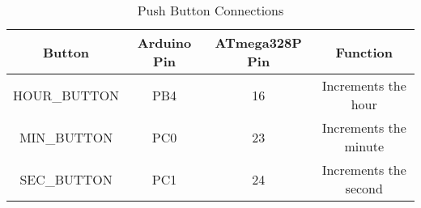 \begin{table}[h]
    \centering
    \begin{tabular}{|c|c|c|c|}
        \hline
        \textbf{Button} & \textbf{Arduino Pin} & \textbf{ATmega328P Pin} & \textbf{Function} \\
        \hline
        HOUR\_BUTTON   & PB4 & 16 & Increments the hour \\
        MIN\_BUTTON    & PC0 & 23 & Increments the minute \\
        SEC\_BUTTON    & PC1 & 24 & Increments the second \\
        \hline
    \end{tabular}
    \caption{Push Button Connections}
    \label{tab:push_buttons}
\end{table}
